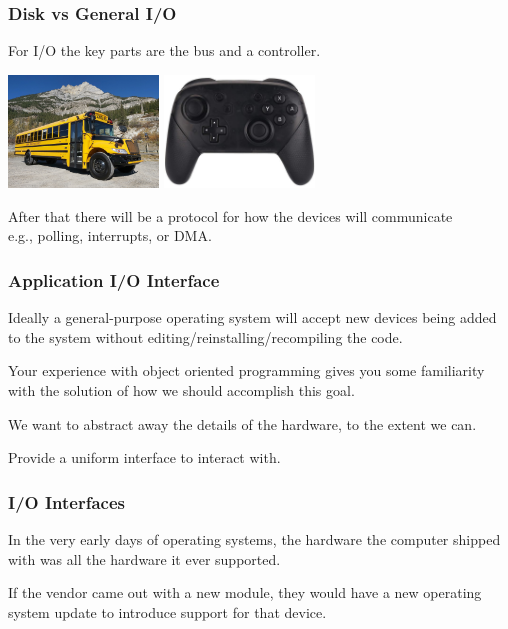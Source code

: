 \begin{frame}
\frametitle{Disk vs General I/O}

For I/O the key parts are the bus and a controller. 

\begin{center}
	\includegraphics[width=0.3\textwidth]{images/bus.jpg}
	\includegraphics[width=0.3\textwidth]{images/controller.jpg}
\end{center}

After that there will be a protocol for how the devices will communicate\\
\quad e.g., polling, interrupts, or DMA.

\end{frame}



\begin{frame}
\frametitle{Application I/O Interface}

Ideally a general-purpose operating system will accept new devices being added to the system without editing/reinstalling/recompiling the code. 

Your experience with object oriented programming gives you some familiarity with the solution of how we should accomplish this goal. 

We want to abstract away the details of the hardware, to the extent we can. 

Provide a uniform \alert{interface} to interact with. 

\end{frame}

\begin{frame}
\frametitle{I/O Interfaces}

In the very early days of operating systems, the hardware the computer shipped with was all the hardware it ever supported. 

If the vendor came out with a new module, they would have a new operating system update to introduce support for that device.


\end{frame}

